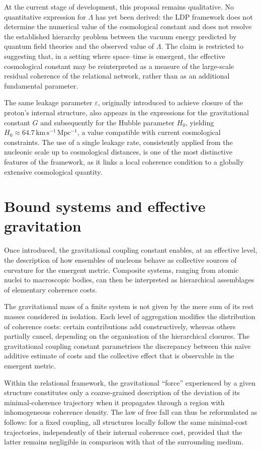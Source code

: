 \documentclass[11pt,a4paper]{article}
\begin{document}
At the current stage of development, this proposal remains qualitative. No quantitative expression for \(\Lambda\) has yet been derived: the LDP framework does not determine the numerical value of the cosmological constant and does not resolve the established hierarchy problem between the vacuum energy predicted by quantum field theories and the observed value of \(\Lambda\). The claim is restricted to suggesting that, in a setting where space–time is emergent, the effective cosmological constant may be reinterpreted as a measure of the large-scale residual coherence of the relational network, rather than as an additional fundamental parameter.

The same leakage parameter \(\varepsilon\), originally introduced to achieve closure of the proton’s internal structure, also appears in the expressions for the gravitational constant \(G\) and subsequently for the Hubble parameter \(H_0\), yielding \(H_0 \approx 64.7\,\mathrm{km\,s^{-1}\,Mpc^{-1}}\), a value compatible with current cosmological constraints. The use of a single leakage rate, consistently applied from the nucleonic scale up to cosmological distances, is one of the most distinctive features of the framework, as it links a local coherence condition to a globally extensive cosmological quantity.

\section{Bound systems and effective gravitation}
Once introduced, the gravitational coupling constant enables, at an effective level, the description of how ensembles of nucleons behave as collective sources of curvature for the emergent metric. Composite systems, ranging from atomic nuclei to macroscopic bodies, can then be interpreted as hierarchical assemblages of elementary coherence costs. 

The gravitational mass of a finite system is not given by the mere sum of its rest masses considered in isolation. Each level of aggregation modifies the distribution of coherence costs: certain contributions add constructively, whereas others partially cancel, depending on the organisation of the hierarchical closures. The gravitational coupling constant parametrises the discrepancy between this naïve additive estimate of costs and the collective effect that is observable in the emergent metric. 

Within the relational framework, the gravitational “force” experienced by a given structure constitutes only a coarse‑grained description of the deviation of its minimal‑coherence trajectory when it propagates through a region with inhomogeneous coherence density. The law of free fall can thus be reformulated as follows: for a fixed coupling, all structures locally follow the same minimal‑cost trajectories, independently of their internal coherence cost, provided that the latter remains negligible in comparison with that of the surrounding medium.
\end{document}
